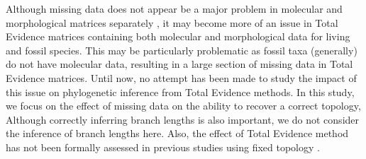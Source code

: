 \documentclass[12pt,letterpaper]{article}
\begin{document}
Although missing data does not appear be a major problem in molecular and morphological matrices separately \citep{wiensmissing2003,wiensmissing2006,wiensmissing2008,rouresite-specific2011,pattinsonphylogeny2014}, it may become more of an issue in Total Evidence matrices containing both molecular and morphological data for living and fossil species. This may be particularly problematic as fossil taxa (generally) do not have molecular data, resulting in a large section of missing data in Total Evidence matrices. Until now, no attempt has been made to study the impact of this issue on phylogenetic inference from Total Evidence methods. 
In this study, we focus on the effect of missing data on the ability to recover a correct topology, 
Although correctly inferring branch lengths is also important, we do not consider the inference of branch lengths here.
Also, the effect of Total Evidence method has not been formally assessed in previous studies using fixed topology \citep{ronquista2012,schragocombining2013,slaterphylogenetic2013,beckancient2014}.
\end{document}
